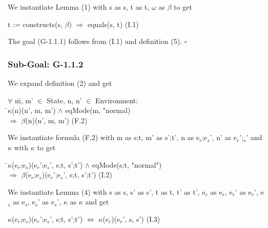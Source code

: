 \documentclass[conference]{IEEEtran}
\begin{document}
\noindent We instantiate Lemma (1) with 
s as s, t as t, $\omega$ as $\beta$ to get
\begin{center}
t := constructs(s, $\beta$) $\Rightarrow$ equals(s, t) \hspace*{2cm} (I.1)
\end{center}

\noindent The goal (G-1.1.1) follows from (I.1) and definition (5). $\square$

\subsubsection*{Sub-Goal: G-1.1.2}

\noindent We expand definition (2) and get

\begin{center}
\begin{tabbing}
$\forall$ \=m, m' $\in$ State, n, n' $\in$ Environment: 
\\\>\textlbrackdbl \=$\kappa$\textrbrackdbl(n)(n', m, m') $\wedge$ eqMode(m, "normal) 
\\\>\>$\Rightarrow$ \textlbrackdbl $\beta$\textrbrackdbl(n)(n', m, m')  \hspace*{4cm} (F.2)
\end{tabbing}
\end{center}

\noindent We instantiate formula (F.2) with
m as s;t, m' as s';t', n as e$_r$;e$_s$', n' as e$_r$';$_s$' and $\kappa$ with $\kappa$ to get

\begin{center}
\begin{tabbing}
\textlbrackdbl \=$\kappa$\textrbrackdbl(e$_r$;e$_s$)(e$_r$';e$_s$', s;t, s';t') $\wedge$ eqMode(s;t, "normal") 
\\\>$\Rightarrow$ \textlbrackdbl $\beta$\textrbrackdbl(e$_r$;e$_s$)(e$_r$';e$_s$', s;t, s';t')   \hspace*{3cm} (I.2)
\end{tabbing}
\end{center}

\noindent We instantiate Lemma (4) with
s as s, s' as s', t as t, t' as t', e$_r$ as e$_r$, e$_r$' as e$_r$', e$_s$ as e$_s$, e$_s$' as e$_s$', $\kappa$ as $\kappa$
and get

\begin{center}
\begin{tabbing}
\textlbrackdbl $\kappa$\textrbrackdbl(e$_r$;e$_s$)(e$_r$';e$_s$', s;t, s';t') $\Leftrightarrow$ \textlbrackdbl $\kappa$\textrbrackdbl(e$_r$)(e$_r$', s, s')   \hspace*{0.8cm} (I.3)
\end{tabbing}
\end{center}
\end{document}
